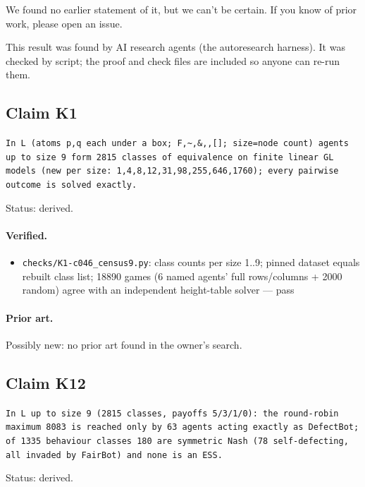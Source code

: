 \documentclass{article}
\begin{document}
We found no earlier statement of it, but we can't be certain. If you know of prior work, please open an issue.

This result was found by AI research agents (the autoresearch harness). It was checked by script; the proof and check files are included so anyone can re-run them.

\subsection*{Claim K1}

\texttt{In L (atoms p,q each under a box; F,\textasciitilde{},\&,\textbar{},[]; size=node count) agents up to size 9 form 2815 classes of equivalence on finite linear GL models (new per size: 1,4,8,12,31,98,255,646,1760); every pairwise outcome is solved exactly.}

Status: derived.

\paragraph{Verified.}
\begin{itemize}
\item \texttt{checks/K1-c046\_census9.py}: class counts per size 1..9; pinned dataset equals rebuilt class list; 18890 games (6 named agents' full rows/columns + 2000 random) agree with an independent height-table solver --- pass
\end{itemize}

\paragraph{Prior art.} Possibly new: no prior art found in the owner's search.

\subsection*{Claim K12}

\texttt{In L up to size 9 (2815 classes, payoffs 5/3/1/0): the round-robin maximum 8083 is reached only by 63 agents acting exactly as DefectBot; of 1335 behaviour classes 180 are symmetric Nash (78 self-defecting, all invaded by FairBot) and none is an ESS.}

Status: derived.
\end{document}
